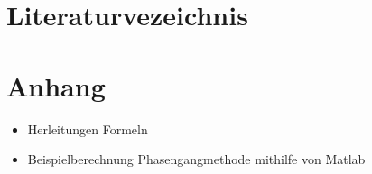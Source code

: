 \documentclass{fhnwreport}
\begin{document}


\section{Literaturvezeichnis}


\newpage
\section{Anhang}
\begin{itemize}
\item Herleitungen Formeln
\item Beispielberechnung Phasengangmethode mithilfe von Matlab
\end{itemize}


\end{document}

